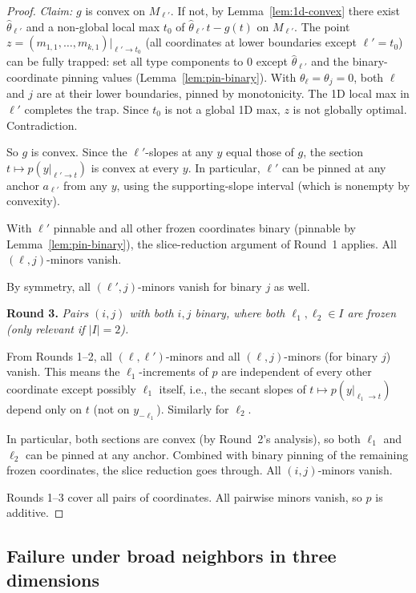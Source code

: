 \documentclass[11pt]{article}
\begin{document}
\begin{proof}
\emph{Claim:} $g$ is convex on $M_{\ell'}$.  If not, by
Lemma~\ref{lem:1d-convex} there exist $\hat\theta_{\ell'}$ and a
non-global local max $t_0$ of $\hat\theta_{\ell'}\, t - g(t)$ on
$M_{\ell'}$.  The point $z = (m_{1,1}, \dots, m_{k,1})|_{\ell' \to t_0}$
(all coordinates at lower boundaries except $\ell' = t_0$) can be
fully trapped: set all type components to $0$ except
$\hat\theta_{\ell'}$ and the binary-coordinate pinning values
(Lemma~\ref{lem:pin-binary}).  With $\theta_\ell = \theta_j = 0$,
both $\ell$ and $j$ are at their lower boundaries, pinned by
monotonicity.  The 1D local max in $\ell'$ completes the trap.
Since $t_0$ is not a global 1D max, $z$ is not globally optimal.
Contradiction.

So $g$ is convex.  Since the $\ell'$-slopes at any $y$ equal those
of $g$, the section $t \mapsto p(y|_{\ell' \to t})$ is convex at
every $y$.  In particular, $\ell'$ can be pinned at any anchor
$a_{\ell'}$ from any $y$, using the supporting-slope interval
(which is nonempty by convexity).

With $\ell'$ pinnable and all other frozen coordinates binary
(pinnable by Lemma~\ref{lem:pin-binary}), the slice-reduction
argument of Round~1 applies.  All $(\ell, j)$-minors vanish.

By symmetry, all $(\ell', j)$-minors vanish for binary $j$ as well.

\medskip\noindent
\textbf{Round 3.}  \emph{Pairs $(i, j)$ with both $i, j$ binary, where
both $\ell_1, \ell_2 \in I$ are frozen (only relevant if $|I| = 2$).}

From Rounds 1--2, all $(\ell, \ell')$-minors and all
$(\ell, j)$-minors (for binary $j$) vanish.  This means the
$\ell_1$-increments of $p$ are independent of every other coordinate
except possibly $\ell_1$ itself, i.e., the secant slopes of
$t \mapsto p(y|_{\ell_1 \to t})$ depend only on $t$ (not on $y_{-\ell_1}$).
Similarly for $\ell_2$.

In particular, both sections are convex (by Round~2's analysis), so
both $\ell_1$ and $\ell_2$ can be pinned at any anchor.  Combined with
binary pinning of the remaining frozen coordinates, the slice reduction
goes through.  All $(i,j)$-minors vanish.

\medskip
Rounds 1--3 cover all pairs of coordinates.  All pairwise minors vanish,
so $p$ is additive.
\end{proof}

\subsection{Failure under broad neighbors in three dimensions}
\end{document}

